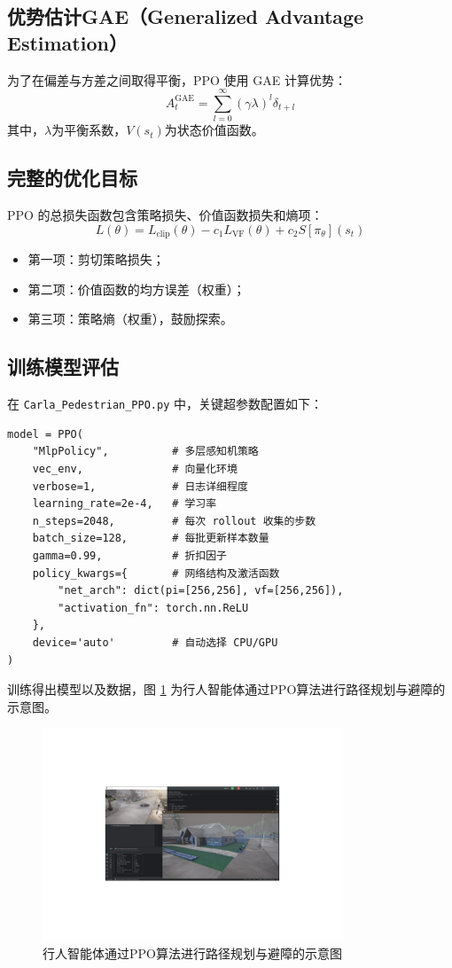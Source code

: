 \subsection{优势估计GAE（Generalized Advantage Estimation）}
为了在偏差与方差之间取得平衡，PPO 使用 GAE 计算优势：
\[
A_t^{\text{GAE}} = \sum_{l=0}^{\infty} (\gamma \lambda)^l \delta_{t+l}
\]
其中，$\lambda$为平衡系数，$V(s_t)$为状态价值函数。

\subsection{完整的优化目标}
PPO 的总损失函数包含策略损失、价值函数损失和熵项：
\[
L(\theta) = L_{\text{clip}}(\theta) - c_1 L_{\text{VF}}(\theta) + c_2 S[\pi_{\theta}](s_t)
\]
\begin{itemize}
    \item 第一项：剪切策略损失；
    \item 第二项：价值函数的均方误差（权重）；
    \item 第三项：策略熵（权重），鼓励探索。
\end{itemize}

\subsection{训练模型评估}
在 \texttt{Carla\_Pedestrian\_PPO.py} 中，关键超参数配置如下：
\begin{verbatim}
model = PPO(
    "MlpPolicy",          # 多层感知机策略
    vec_env,              # 向量化环境
    verbose=1,            # 日志详细程度
    learning_rate=2e-4,   # 学习率
    n_steps=2048,         # 每次 rollout 收集的步数
    batch_size=128,       # 每批更新样本数量
    gamma=0.99,           # 折扣因子
    policy_kwargs={       # 网络结构及激活函数
        "net_arch": dict(pi=[256,256], vf=[256,256]),
        "activation_fn": torch.nn.ReLU
    },
    device='auto'         # 自动选择 CPU/GPU
)
\end{verbatim}

训练得出模型以及数据，图 \ref{fig:path_planning} 为行人智能体通过PPO算法进行路径规划与避障的示意图。

\begin{figure}[H]
    \centering
    \includegraphics[width=0.8\textwidth]{images/path_planning.pdf}
    \caption{行人智能体通过PPO算法进行路径规划与避障的示意图}
    \label{fig:path_planning}
\end{figure}

